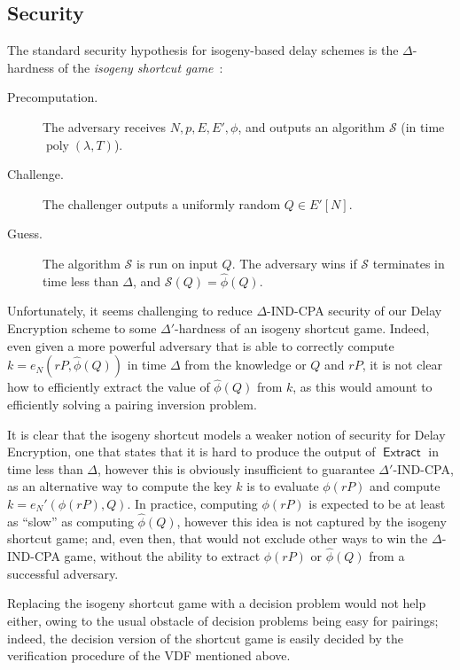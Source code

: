 \documentclass{llncs}
\DeclareMathOperator{\poly}{poly}
\DeclareMathOperator{\Extract}{\mathsf{Extract}}
\begin{document}
\subsection{Security}

The standard security hypothesis for isogeny-based delay schemes is
the $\Delta$-hardness of the \emph{isogeny shortcut
  game}~\cite{10.1007/978-3-030-34578-5_10}:

\begin{description}
\item[Precomputation.] The adversary receives $N,p,E,E',\phi$, and
  outputs an algorithm $\mathcal{S}$ (in time $\poly(\lambda,T)$).
\item[Challenge.] The challenger outputs a uniformly random
  $Q\in E'[N]$.
\item[Guess.] The algorithm $\mathcal{S}$ is run on input $Q$. The
  adversary wins if $\mathcal{S}$ terminates in time less than
  $\Delta$, and $\mathcal{S}(Q) = \hat\phi(Q)$.
\end{description}

Unfortunately, it seems challenging to reduce $\Delta$-IND-CPA
security of our Delay Encryption scheme to some $\Delta'$-hardness of
an isogeny shortcut game. %
Indeed, even given a more powerful adversary that is able to correctly
compute $k=e_N(rP,\hat\phi(Q))$ in time $\Delta$ from the knowledge or
$Q$ and $rP$, it is not clear how to efficiently extract the value of
$\hat\phi(Q)$ from $k$, as this would amount to efficiently solving a
pairing inversion problem.

It is clear that the isogeny shortcut models a weaker notion of
security for Delay Encryption, one that states that it is hard to
produce the output of $\Extract$ in time less than $\Delta$, however
this is obviously insufficient to guarantee $\Delta'$-IND-CPA, as an
alternative way to compute the key $k$ is to evaluate $\phi(rP)$ and
compute $k=e_N'(\phi(rP), Q)$. %
In practice, computing $\phi(rP)$ is expected to be at least as
``slow'' as computing $\hat\phi(Q)$, however this idea is not captured
by the isogeny shortcut game; and, even then, that would not exclude
other ways to win the $\Delta$-IND-CPA game, without the ability to
extract $\phi(rP)$ or $\hat\phi(Q)$ from a successful adversary.

Replacing the isogeny shortcut game with a decision problem would not
help either, owing to the usual obstacle of decision problems being
easy for pairings; indeed, the decision version of the shortcut game
is easily decided by the verification procedure of the VDF mentioned
above.
\end{document}
